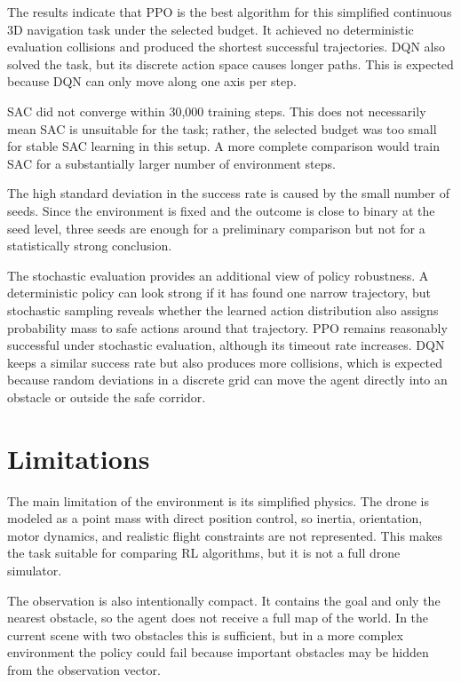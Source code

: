 \documentclass[conference]{IEEEtran}
\begin{document}
The results indicate that PPO is the best algorithm for this simplified
continuous 3D navigation task under the selected budget. It achieved no
deterministic evaluation collisions and produced the shortest successful
trajectories. DQN also solved the task, but its discrete action space causes
longer paths. This is expected because DQN can only move along one axis per
step.

SAC did not converge within 30,000 training steps. This does not necessarily
mean SAC is unsuitable for the task; rather, the selected budget was too small
for stable SAC learning in this setup. A more complete comparison would train
SAC for a substantially larger number of environment steps.

The high standard deviation in the success rate is caused by the small number
of seeds. Since the environment is fixed and the outcome is close to binary at
the seed level, three seeds are enough for a preliminary comparison but not for
a statistically strong conclusion.

The stochastic evaluation provides an additional view of policy robustness. A
deterministic policy can look strong if it has found one narrow trajectory, but
stochastic sampling reveals whether the learned action distribution also
assigns probability mass to safe actions around that trajectory. PPO remains
reasonably successful under stochastic evaluation, although its timeout rate
increases. DQN keeps a similar success rate but also produces more collisions,
which is expected because random deviations in a discrete grid can move the
agent directly into an obstacle or outside the safe corridor.

\section{Limitations}

The main limitation of the environment is its simplified physics. The drone is
modeled as a point mass with direct position control, so inertia, orientation,
motor dynamics, and realistic flight constraints are not represented. This
makes the task suitable for comparing RL algorithms, but it is not a full drone
simulator.

The observation is also intentionally compact. It contains the goal and only
the nearest obstacle, so the agent does not receive a full map of the world. In
the current scene with two obstacles this is sufficient, but in a more complex
environment the policy could fail because important obstacles may be hidden
from the observation vector.
\end{document}
